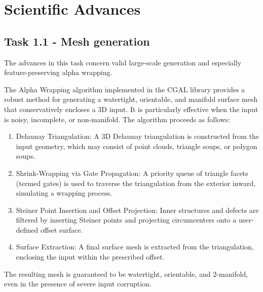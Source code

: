 \begin{itemize}
%
\end{itemize} 

\section{Scientific Advances}

\subsection{Task 1.1 - Mesh generation}
The advances in this task concern valid large-scale generation and especially feature-preserving alpha wrapping.

The Alpha Wrapping algorithm implemented in the CGAL library provides a robust method for generating a watertight, orientable, and manifold surface mesh that conservatively encloses a 3D input. It is particularly effective when the input is noisy, incomplete, or non-manifold. The algorithm proceeds as follows:

\begin{enumerate}
\item Delaunay Triangulation: A 3D Delaunay triangulation is constructed from the input geometry, which may consist of point clouds, triangle soups, or polygon soups.
\item Shrink-Wrapping via Gate Propagation: A priority queue of triangle facets (termed gates) is used to traverse the triangulation from the exterior inward, simulating a wrapping process.
\item Steiner Point Insertion and Offset Projection: Inner structures and defects are filtered by inserting Steiner points and projecting circumcenters onto a user-defined offset surface.
\item Surface Extraction: A final surface mesh is extracted from the triangulation, enclosing the input within the prescribed offset.
\end{enumerate}

The resulting mesh is guaranteed to be watertight, orientable, and 2-manifold, even in the presence of severe input corruption.

